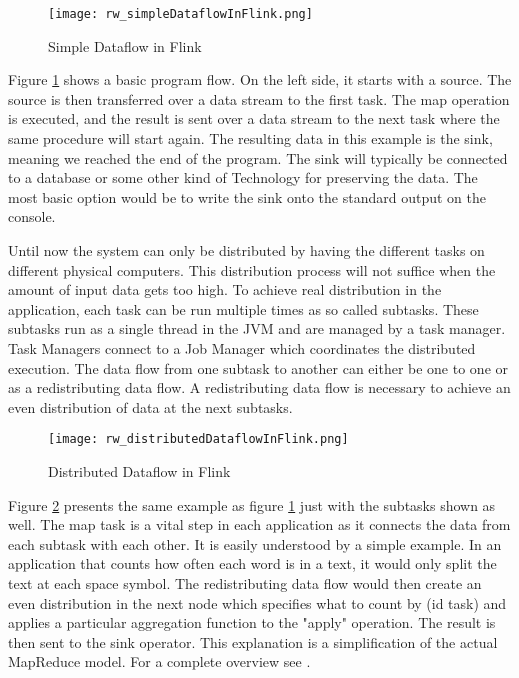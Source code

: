 \begin{figure}[h!]
    \centering
      \texttt{[image: rw\_simpleDataflowInFlink.png]}
      \caption{Simple Dataflow in Flink}
      \label{simpleDataflowInFlink}
\end{figure}

Figure \ref{simpleDataflowInFlink} shows a basic program flow. On the left side, it starts with a source. The source is then transferred over a data stream to the first task. The map operation is executed, and the result is sent over a data stream to the next task where the same procedure will start again. The resulting data in this example is the sink, meaning we reached the end of the program. The sink will typically be connected to a database or some other kind of Technology for preserving the data. The most basic option would be to write the sink onto the standard output on the console.

Until now the system can only be distributed by having the different tasks on different physical computers. This distribution process will not suffice when the amount of input data gets too high. To achieve real distribution in the application, each task can be run multiple times as so called subtasks. These subtasks run as a single thread in the JVM and are managed by a task manager. Task Managers connect to a Job Manager which coordinates the distributed execution. The data flow from one subtask to another can either be one to one or as a redistributing data flow. A redistributing data flow is necessary to achieve an even distribution of data at the next subtasks.

\begin{figure}[h!]
    \centering
      \texttt{[image: rw\_distributedDataflowInFlink.png]}
      \caption{Distributed Dataflow in Flink}
      \label{distributedDataflowInFlink}
\end{figure}

Figure \ref{distributedDataflowInFlink} presents the same example as figure \ref{simpleDataflowInFlink} just with the subtasks shown as well. The map task is a vital step in each application as it connects the data from each subtask with each other. It is easily understood by a simple example.
In an application that counts how often each word is in a text, it would only split the text at each space symbol. The redistributing data flow would then create an even distribution in the next node which specifies what to count by (id task) and applies a particular aggregation function to the "apply" operation. The result is then sent to the sink operator. This explanation is a simplification of the actual MapReduce model. For a complete overview see \cite{dean2008mapreduce}.

